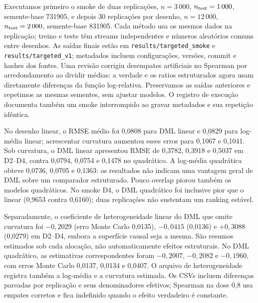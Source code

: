 Executamos primeiro o smoke de duas replicações, $n=3\,000$, $n_{\rm test}=1\,000$, semente-base 731905, e depois 30 replicações por desenho, $n=12\,000$, $n_{\rm test}=2\,000$, semente-base 831905. Cada método usa os mesmos dados na replicação; treino e teste têm streams independentes e números aleatórios comuns entre desenhos. As saídas finais estão em \texttt{results/targeted\_smoke} e \texttt{results/targeted\_v1}; metadados incluem configurações, versões, commit e hashes dos fontes. Uma revisão corrigiu desempates artificiais no Spearman por arredondamento ao dividir médias: a verdade e os ratios estruturados agora usam diretamente diferenças da função log-relativa. Preservamos as saídas anteriores e repetimos as mesmas sementes, sem ajustar modelos. O registro de execução documenta também um smoke interrompido ao gravar metadados e sua repetição idêntica.

\begin{table}[htbp]
\centering
\caption{Benchmark adicional executado: média (erro Monte Carlo) em 30 replicações. D1: linear padrão; D2: curvo aleatorizado; D3: curvo padrão; D4: curvo com pouco overlap. Falhas são contadas mesmo quando não há métrica disponível.}
\label{tab:targeted}
\footnotesize
\setlength{\tabcolsep}{4pt}

\end{table}

No desenho linear, o RMSE médio foi 0,0808 para DML linear e 0,0829 para log-média linear; acrescentar curvatura aumentou esses erros para 0,1067 e 0,1041. Sob curvatura, o DML linear apresentou RMSE de 0,3782, 0,3918 e 0,5037 em D2--D4, contra 0,0794, 0,0754 e 0,1478 no quadrático. A log-média quadrática obteve 0,0736, 0,0705 e 0,1363: os resultados não indicam uma vantagem geral de DML sobre um comparador estruturado. Pouco overlap piorou também os modelos quadráticos. No smoke D4, o DML quadrático foi inclusive pior que o linear (0,9653 contra 0,6160); duas replicações não sustentam um ranking estável.

Separadamente, o coeficiente de heterogeneidade linear do DML que omite curvatura foi $-0{,}2029$ (erro Monte Carlo 0,0135), $-0{,}0415$ (0,0136) e $+0{,}3088$ (0,0279) em D2--D4, embora a superfície causal seja a mesma. São resumos estimados sob cada alocação, não automaticamente efeitos estruturais. No DML quadrático, as estimativas correspondentes foram $-0{,}2007$, $-0{,}2082$ e $-0{,}1960$, com erros Monte Carlo 0,0137, 0,0134 e 0,0407. O arquivo de heterogeneidade registra também a log-média e a curvatura estimada. Os CSVs incluem diferenças pareadas por replicação e seus denominadores efetivos; Spearman na dose 0,8 usa empates corretos e fica indefinido quando o efeito verdadeiro é constante.

